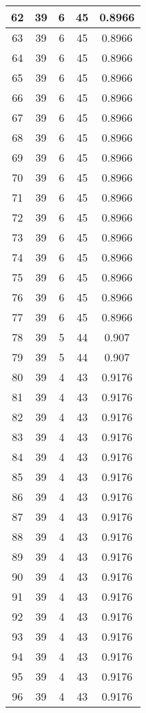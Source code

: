 \documentclass[letterpaper, 12pt]{article}
\begin{document}
\begin{longtable}{|c|c|c|c|c|}
\hline
62 & 39 & 6 & 45 & 0.8966 \\
\hline
63 & 39 & 6 & 45 & 0.8966 \\
\hline
64 & 39 & 6 & 45 & 0.8966 \\
\hline
65 & 39 & 6 & 45 & 0.8966 \\
\hline
66 & 39 & 6 & 45 & 0.8966 \\
\hline
67 & 39 & 6 & 45 & 0.8966 \\
\hline
68 & 39 & 6 & 45 & 0.8966 \\
\hline
69 & 39 & 6 & 45 & 0.8966 \\
\hline
70 & 39 & 6 & 45 & 0.8966 \\
\hline
71 & 39 & 6 & 45 & 0.8966 \\
\hline
72 & 39 & 6 & 45 & 0.8966 \\
\hline
73 & 39 & 6 & 45 & 0.8966 \\
\hline
74 & 39 & 6 & 45 & 0.8966 \\
\hline
75 & 39 & 6 & 45 & 0.8966 \\
\hline
76 & 39 & 6 & 45 & 0.8966 \\
\hline
77 & 39 & 6 & 45 & 0.8966 \\
\hline
78 & 39 & 5 & 44 & 0.907 \\
\hline
79 & 39 & 5 & 44 & 0.907 \\
\hline
80 & 39 & 4 & 43 & 0.9176 \\
\hline
81 & 39 & 4 & 43 & 0.9176 \\
\hline
82 & 39 & 4 & 43 & 0.9176 \\
\hline
83 & 39 & 4 & 43 & 0.9176 \\
\hline
84 & 39 & 4 & 43 & 0.9176 \\
\hline
85 & 39 & 4 & 43 & 0.9176 \\
\hline
86 & 39 & 4 & 43 & 0.9176 \\
\hline
87 & 39 & 4 & 43 & 0.9176 \\
\hline
88 & 39 & 4 & 43 & 0.9176 \\
\hline
89 & 39 & 4 & 43 & 0.9176 \\
\hline
90 & 39 & 4 & 43 & 0.9176 \\
\hline
91 & 39 & 4 & 43 & 0.9176 \\
\hline
92 & 39 & 4 & 43 & 0.9176 \\
\hline
93 & 39 & 4 & 43 & 0.9176 \\
\hline
94 & 39 & 4 & 43 & 0.9176 \\
\hline
95 & 39 & 4 & 43 & 0.9176 \\
\hline
96 & 39 & 4 & 43 & 0.9176 \\

\end{longtable}
\end{document}
